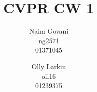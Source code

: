 \documentclass[10pt,twocolumn,letterpaper]{article}
\begin{document}
\title{CVPR CW 1}

\author{Naim Govani\\
ng2571\\
01371045\\
\and
Olly Larkin\\
oll16\\
01239375\\
}

\maketitle







\clearpage

{\small


}


\end{document}
